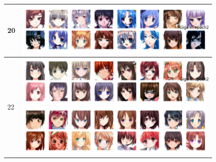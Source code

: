 \documentclass[twocolumn,superscriptaddress,aps]{revtex4-1}
\begin{document}
\begin{figure}[H]
\begin{tabular}{|p{.3cm}|p{}@{}}
        20 & \includegraphics[width=\linewidth]{figures/giga_unet_ddpm_85M_ckpt_epoch_20_epoch_20_samples.png} \\
        \hline

        22 & \includegraphics[width=\linewidth]{figures/giga_unet_ddpm_85M_ckpt_epoch_22_epoch_22_samples.png} 
         \includegraphics[width=\linewidth]{figures/mega_unet_ddpm_85M_ckpt_epoch_22_with_16_samples.png} \\
        \hline
    \end{tabular}
\end{figure}
\end{document}
